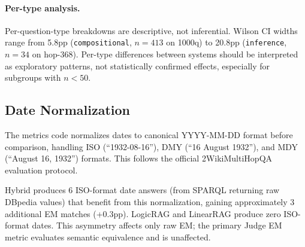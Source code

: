 \paragraph{Per-type analysis.}
Per-question-type breakdowns are descriptive, not inferential. Wilson CI widths range from 5.8pp (\texttt{compositional}, $n=413$ on 1000q) to 20.8pp (\texttt{inference}, $n=34$ on hop-368). Per-type differences between systems should be interpreted as exploratory patterns, not statistically confirmed effects, especially for subgroups with $n < 50$.

\subsection{Date Normalization}
\label{sec:date-norm}

The metrics code normalizes dates to canonical YYYY-MM-DD format before comparison, handling ISO (``1932-08-16''), DMY (``16 August 1932''), and MDY (``August 16, 1932'') formats. This follows the official 2WikiMultiHopQA evaluation protocol.

Hybrid produces 6 ISO-format date answers (from SPARQL returning raw DBpedia values) that benefit from this normalization, gaining approximately 3 additional EM matches (+0.3pp). LogicRAG and LinearRAG produce zero ISO-format dates. This asymmetry affects only raw EM; the primary Judge EM metric evaluates semantic equivalence and is unaffected.
